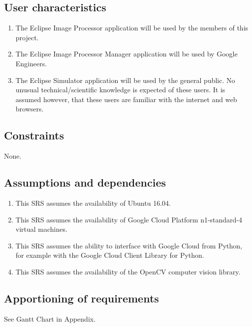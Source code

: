 \documentclass[10pt, onecolumn, draftclsnofoot, letterpaper, compsoc]{IEEEtran}
\begin{document}
\subsection{User characteristics}
	\begin{enumerate}
		\item The Eclipse Image Processor application will be used by
			 the members of this project.

		\item The Eclipse Image Processor Manager application will be used by
			Google Engineers.

		\item The Eclipse Simulator application will be used by the
			general public. No unusual technical/scientific knowledge is
			expected of these users. It is assumed however, that these users
			are familiar with the internet and web browsers.
	\end{enumerate}

\subsection{Constraints}
None.

\subsection{Assumptions and dependencies}
	\begin{enumerate}
		\item This SRS assumes the availability of Ubuntu 16.04.

		\item This SRS assumes the availability of Google Cloud Platform
		n1-standard-4 virtual machines.

		\item This SRS assumes the ability to interface with Google Cloud from
		Python, for example with the Google Cloud Client Library for Python.

		\item This SRS assumes the availability of the OpenCV computer
		vision library.
	\end{enumerate}

\subsection{Apportioning of requirements}
See Gantt Chart in Appendix.

\newpage
\end{document}
